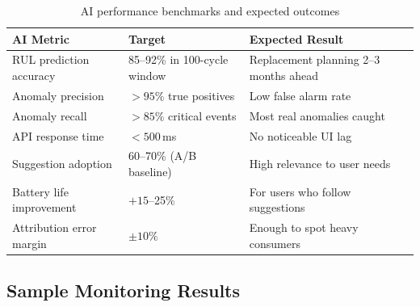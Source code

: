 \documentclass[12pt,a4paper]{report}
\begin{document}
\begin{table}[H]
\caption{AI performance benchmarks and expected outcomes}
\centering
\small
\begin{tabular}{lll}
\toprule
\textbf{AI Metric} & \textbf{Target} & \textbf{Expected Result}\\
\midrule
RUL prediction accuracy   & 85--92\% in 100-cycle window & Replacement planning 2--3 months ahead\\
Anomaly precision         & $>95\%$ true positives      & Low false alarm rate\\
Anomaly recall            & $>85\%$ critical events     & Most real anomalies caught\\
API response time         & $<500$\,ms                  & No noticeable UI lag\\
Suggestion adoption       & 60--70\% (A/B baseline)     & High relevance to user needs\\
Battery life improvement  & $+15$--25\%                 & For users who follow suggestions\\
Attribution error margin  & $\pm 10\%$                  & Enough to spot heavy consumers\\
\bottomrule
\end{tabular}
\end{table}

\subsection{Sample Monitoring Results}
\end{document}
